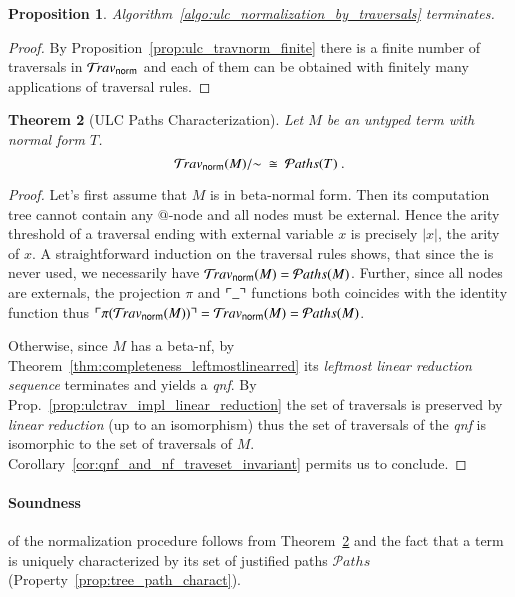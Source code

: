 \documentclass{elsarticle}
\theoremstyle{plain}
\newtheorem{theorem}{Theorem}[section]
\newtheorem{proposition}[theorem]{Proposition}
\theoremstyle{definition}
\theoremstyle{remark}
\newtheorem{remark}{Remark}[section]
\newcommand{\normalizing}{{\sf norm}}
\newcommand{\travsetnorm}{\travset_\normalizing}
\newcommand{\travulc}{\travset}
\def\coresymbol{\pi} %
\newcommand{\core}[1]{\coresymbol(#1)} %
\newcommand\pathset{{\mathcal{P}aths}} %
\begin{document}
\begin{proposition}
Algorithm~\ref{algo:ulc_normalization_by_traversals} terminates.
\end{proposition}
\begin{proof}
By Proposition~\ref{prop:ulc_travnorm_finite} there is a finite number of traversals in $\travsetnorm$ and each of them can be obtained with finitely many applications of traversal rules.
\end{proof}

\begin{theorem}[ULC Paths Characterization]
\label{thm:path_charact_ulc}
Let $M$ be an untyped term with normal form $T$.
$$\travsetnorm(M)/{\sim} \ \cong\ \pathset(T) \ .$$
\end{theorem}
\begin{proof}
Let's first assume that $M$ is in beta-normal form. Then its computation tree cannot contain any $@$-node and all nodes must be external.
Hence the arity threshold of a traversal ending with external variable $x$ is precisely $|x|$, the arity of $x$. A straightforward induction on the traversal
rules shows, that since the  is never used, we necessarily have  $\travsetnorm(M) = \pathset(M)$. Further, since all nodes are externals, the projection $\coresymbol$ and $\ulcorner \_ \urcorner$ functions both coincides with the identity function thus $\pview{\core{\travsetnorm(M)}} = \travsetnorm(M) = \pathset(M)$.

Otherwise, since $M$ has a beta-nf, by Theorem~\ref{thm:completeness_leftmostlinearred} its \emph{leftmost linear reduction sequence} terminates and yields a \emph{qnf}. By Prop.~\ref{prop:ulctrav_impl_linear_reduction} the set of traversals is preserved by \emph{linear reduction} (up to an isomorphism) thus the set of traversals of the \emph{qnf} is isomorphic to the set of traversals of $M$. Corollary~\ref{cor:qnf_and_nf_traveset_invariant} permits us to conclude.
\end{proof}

\paragraph{Soundness} of the normalization procedure follows from Theorem~\ref{thm:path_charact_ulc} and the fact that a term is uniquely characterized by its set of justified paths $\pathset$ (Property~\ref{prop:tree_path_charact}).

\end{document}
